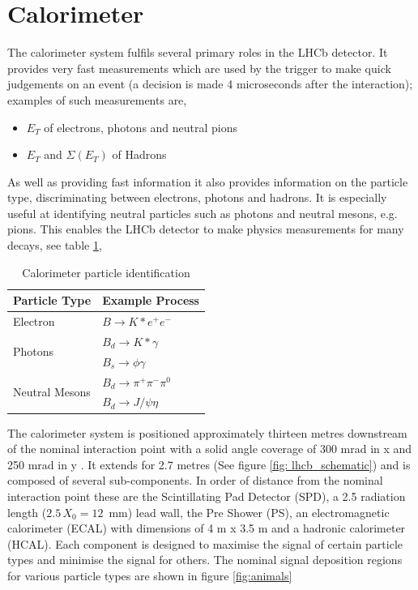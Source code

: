 \section{Calorimeter}

The calorimeter system fulfils several primary roles in the LHCb detector. It provides very fast measurements which are used by the trigger to make quick judgements on an event (a decision is made 4 microseconds after the interaction); examples of such measurements are,

\begin{itemize}
	\item $E_T$ of electrons, photons and neutral pions 
	\item $E_T$ and $\Sigma(E_T)$ of Hadrons
\end{itemize}

As well as providing fast information it also provides information on the particle type, discriminating between electrons, photons and hadrons. It is especially useful at identifying neutral particles such as photons and neutral mesons, e.g. pions. This enables the LHCb detector to make  physics measurements for many decays, see table \ref{table: calorimeter processes},
\\
\begin{table}[h]
	\begin{center}
		\begin{tabular}{ |l|l| }
			\hline
			Particle Type & Example Process \\ \hline
			Electron & $B \rightarrow K* e^+ e^-$ \\ \hline
			\multirow{2}{*}{Photons} & $B_d \rightarrow K* \gamma$ \\
				 & $B_s \rightarrow \phi \gamma$ \\ \hline
			\multirow{2}{*}{Neutral Mesons} & $B_d \rightarrow \pi^+\pi^-\pi^0$ \\
				 &  $B_d \rightarrow J/\psi \eta$ \\ \hline
		\end{tabular}
		\caption{Calorimeter particle identification}
		\label{table: calorimeter processes}
	\end{center}
\end{table}

The calorimeter system is positioned approximately thirteen metres downstream of the nominal interaction point with a solid angle coverage of 300 mrad in x and 250 mrad in y \cite{Amato:494264}. It extends for 2.7 metres (See figure \ref{fig: lhcb_schematic}) and is composed of several sub-components. In order of distance from the nominal interaction point these are the Scintillating Pad Detector (SPD), a 2.5 radiation length ($2.5\,X_0 = 12$~mm) lead wall, the Pre Shower (PS), an electromagnetic calorimeter (ECAL) with dimensions of 4 m x 3.5 m and a hadronic calorimeter (HCAL). Each component is designed to maximise the signal of certain particle types and minimise the signal for others. The nominal signal deposition regions for various particle types are shown in figure \ref{fig:animals}

